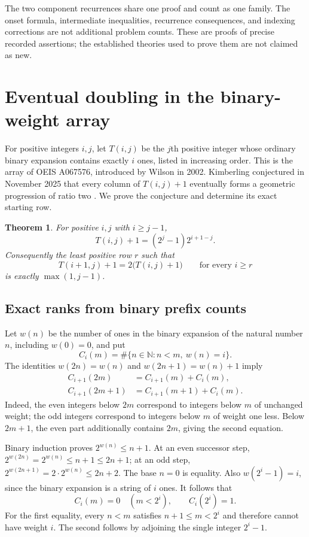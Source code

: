 \documentclass[11pt]{article}
\newtheorem{theorem}{Theorem}[section]
\begin{document}
The two component recurrences share one proof and count as one family.
The onset formula, intermediate inequalities, recurrence consequences, and
indexing corrections are not additional problem counts. These are proofs
of precise recorded assertions; the established theories used to prove them
are not claimed as new.

\section{Eventual doubling in the binary-weight array}

For positive integers $i,j$, let $T(i,j)$ be the $j$th positive integer
whose ordinary binary expansion contains exactly $i$ ones, listed in
increasing order. This is the array of OEIS A067576, introduced by
Wilson in 2002. Kimberling conjectured in November 2025 that every
column of $T(i,j)+1$ eventually forms a geometric progression of ratio
two \cite{oeis067576}. We prove the conjecture and determine its exact
starting row.

\begin{theorem}\label{a067576:main}
For positive $i,j$ with $i\ge j-1$,
\begin{equation}\label{a067576:formula}
 T(i,j)+1=(2^j-1)2^{i+1-j}.
\end{equation}
Consequently the least positive row $r$ such that
\[
 T(i+1,j)+1=2\bigl(T(i,j)+1\bigr)\qquad\text{for every }i\ge r
\]
is exactly $\max(1,j-1)$.
\end{theorem}

\subsection*{Exact ranks from binary prefix counts}
Let $w(n)$ be the number of ones in the binary expansion of the natural
number $n$, including $w(0)=0$, and put
\[
 C_i(m)=\#\{n\in\mathbb N: n<m,\ w(n)=i\}.
\]
The identities $w(2n)=w(n)$ and $w(2n+1)=w(n)+1$ imply
\begin{align}
 C_{i+1}(2m)&=C_{i+1}(m)+C_i(m),\label{a067576:even}\\
 C_{i+1}(2m+1)&=C_{i+1}(m+1)+C_i(m).\label{a067576:odd}
\end{align}
Indeed, the even integers below $2m$ correspond to integers below $m$
of unchanged weight; the odd integers correspond to integers below $m$
of weight one less. Below $2m+1$, the even part additionally contains
$2m$, giving the second equation.

Binary induction proves $2^{w(n)}\le n+1$. At an even successor step,
$2^{w(2n)}=2^{w(n)}\le n+1\le2n+1$; at an odd step,
$2^{w(2n+1)}=2\cdot2^{w(n)}\le2n+2$. The base $n=0$ is equality.
Also $w(2^i-1)=i$, since the binary expansion is a string of $i$ ones.
It follows that
\begin{equation}\label{a067576:minimum}
 C_i(m)=0\quad(m<2^i),\qquad C_i(2^i)=1.
\end{equation}
For the first equality, every $n<m$ satisfies $n+1\le m<2^i$ and
therefore cannot have weight $i$. The second follows by adjoining the
single integer $2^i-1$.
\end{document}
